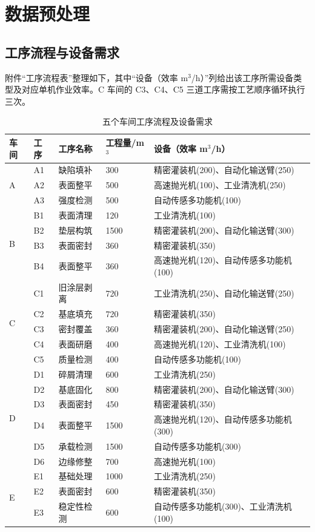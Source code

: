 \documentclass[12pt,a4paper]{article}
\begin{document}
\section{数据预处理}

\subsection{工序流程与设备需求}

附件“工序流程表”整理如下，其中“设备（效率 m$^3$/h）”列给出该工序所需设备类型及对应单机作业效率。C 车间的 C3、C4、C5 三道工序需按工艺顺序循环执行三次。

\begin{table}[H]
\centering
\caption{五个车间工序流程及设备需求}
\small
\renewcommand{\arraystretch}{1.05}
\begin{tabular}{llllll}
\toprule
车间 & 工序 & 工序名称 & 工程量/m$^3$ & 设备（效率 m$^3$/h） \\
\midrule
\multirow{3}{*}{A} & A1 & 缺陷填补 & 300 & 精密灌装机(200)、自动化输送臂(250) \\
& A2 & 表面整平 & 500 & 高速抛光机(100)、工业清洗机(250) \\
& A3 & 强度检测 & 500 & 自动传感多功能机(100) \\
\midrule
\multirow{4}{*}{B} & B1 & 表面清理 & 120 & 工业清洗机(100) \\
& B2 & 垫层构筑 & 1500 & 精密灌装机(200)、自动化输送臂(300) \\
& B3 & 表面密封 & 360 & 精密灌装机(350) \\
& B4 & 表面整平 & 360 & 高速抛光机(120)、自动传感多功能机(100) \\
\midrule
\multirow{5}{*}{C} & C1 & 旧涂层剥离 & 720 & 工业清洗机(250)、自动化输送臂(250) \\
& C2 & 基底填充 & 720 & 精密灌装机(350) \\
& C3 & 密封覆盖 & 360 & 精密灌装机(200)、自动化输送臂(250) \\
& C4 & 表面研磨 & 400 & 高速抛光机(120)、工业清洗机(100) \\
& C5 & 质量检测 & 400 & 自动传感多功能机(100) \\
\midrule
\multirow{6}{*}{D} & D1 & 碎屑清理 & 600 & 工业清洗机(250) \\
& D2 & 基底固化 & 800 & 精密灌装机(200)、自动化输送臂(300) \\
& D3 & 表面密封 & 450 & 精密灌装机(350) \\
& D4 & 表面整平 & 1500 & 高速抛光机(120)、自动传感多功能机(300) \\
& D5 & 承载检测 & 1500 & 自动传感多功能机(300) \\
& D6 & 边缘修整 & 700 & 高速抛光机(100) \\
\midrule
\multirow{3}{*}{E} & E1 & 基础处理 & 1000 & 工业清洗机(250) \\
& E2 & 表面密封 & 600 & 精密灌装机(350) \\
& E3 & 稳定性检测 & 600 & 自动传感多功能机(300)、工业清洗机(100) \\
\bottomrule
\end{tabular}
\end{table}
\end{document}
